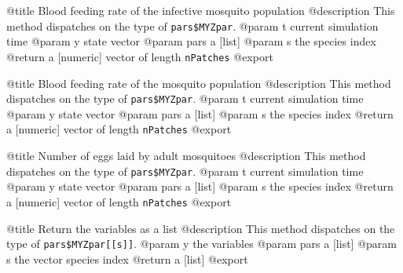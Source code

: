\documentclass[
]{article}
\newenvironment{Shaded}{\begin{snugshade}}{\end{snugshade}}
\newcommand{\ControlFlowTok}[1]{\textcolor[rgb]{0.13,0.29,0.53}{\textbf{#1}}}
\newcommand{\FunctionTok}[1]{\textcolor[rgb]{0.13,0.29,0.53}{\textbf{#1}}}
\newcommand{\NormalTok}[1]{#1}
\newcommand{\OtherTok}[1]{\textcolor[rgb]{0.56,0.35,0.01}{#1}}
\newcommand{\SpecialCharTok}[1]{\textcolor[rgb]{0.81,0.36,0.00}{\textbf{#1}}}
\newcommand{\StringTok}[1]{\textcolor[rgb]{0.31,0.60,0.02}{#1}}
\begin{document}
@title Blood feeding rate of the infective mosquito population
@description This method dispatches on the type of
\texttt{pars\$MYZpar}. @param t current simulation time @param y state
vector @param pars a {[}list{]} @param s the species index @return a
{[}numeric{]} vector of length \texttt{nPatches} @export

\begin{Shaded}
\end{Shaded}

@title Blood feeding rate of the mosquito population @description This
method dispatches on the type of \texttt{pars\$MYZpar}. @param t current
simulation time @param y state vector @param pars a {[}list{]} @param s
the species index @return a {[}numeric{]} vector of length
\texttt{nPatches} @export

\begin{Shaded}
\end{Shaded}

@title Number of eggs laid by adult mosquitoes @description This method
dispatches on the type of \texttt{pars\$MYZpar}. @param t current
simulation time @param y state vector @param pars a {[}list{]} @param s
the species index @return a {[}numeric{]} vector of length
\texttt{nPatches} @export

\begin{Shaded}
\end{Shaded}

@title Return the variables as a list @description This method
dispatches on the type of \texttt{pars\$MYZpar{[}{[}s{]}{]}}. @param y
the variables @param pars a {[}list{]} @param s the vector species index
@return a {[}list{]} @export
\end{document}
